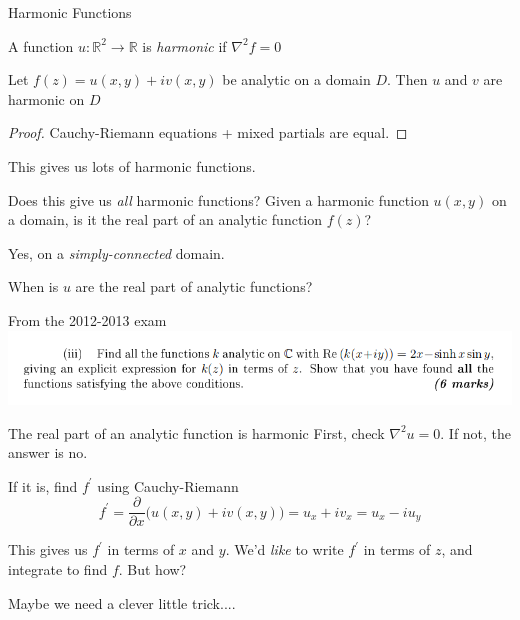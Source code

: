 \documentclass{beamer}
\newcommand{\R}{\mathbb{R}}
\begin{document}
\begin{frame}{Harmonic Functions}
\begin{definition}
A function $u:\R^2\to\R$ is \emph{harmonic} if $\nabla^2f=0$
\end{definition}

\begin{lemma}Let $f(z)=u(x,y)+iv(x,y)$ be analytic on a domain $D$.  Then $u$ and $v$ are harmonic on $D$
\end{lemma}
\begin{proof} Cauchy-Riemann equations + mixed partials are equal.
\end{proof}
This gives us lots of harmonic functions.  
\begin{block}{Does this give us \emph{all} harmonic functions?}
Given a harmonic function $u(x,y)$ on a domain, is it the real part of an analytic function $f(z)$?
\end{block}
Yes, on a \emph{simply-connected} domain.

\end{frame}

\begin{frame}{When is $u$ are the real part of analytic functions?}
\begin{block}{From the 2012-2013 exam}
\includegraphics[width=\textwidth,height=0.8\textheight,keepaspectratio]{RealPart2012.png}
\end{block}

\begin{block}{The real part of an analytic function is harmonic}
First, check $\nabla^2u=0$.  If not, the answer is no.
\end{block}

\begin{block}{If it is, find $f^\prime$ using Cauchy-Riemann}
$$f^\prime=\frac{\partial}{\partial x} \Big(u(x,y)+iv(x,y)\Big)=u_x+iv_x=u_x-iu_y$$
\end{block}

This gives us $f^\prime$ in terms of $x$ and $y$.  We'd \emph{like} to write $f^\prime$ in terms of $z$, and integrate to find $f$. But how?

\begin{block}{Maybe we need a clever little trick....}
\end{block}

\end{frame}
\end{document}
